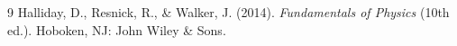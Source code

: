 \documentclass[12pt,a4paper]{article}
\begin{document}
\clearpage
{}
{}
\begin{thebibliography}{9}
Halliday, D., Resnick, R., \& Walker, J. (2014).
\textit{Fundamentals of Physics} (10th ed.). Hoboken, NJ: John Wiley \& Sons.
\end{thebibliography}
\end{document}
